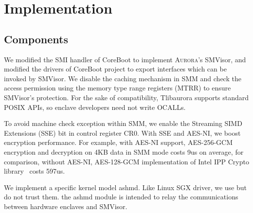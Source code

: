 \section{Implementation}

\subsection{Components}

We modified the SMI handler of CoreBoot to implement \textsc{Aurora}'s SMVisor, and modified the drivers of CoreBoot project to export interfaces which can be invoked by SMVisor. We disable the caching mechanism in SMM and check the access permission using the memory type range registers (MTRR) to ensure SMVisor's protection. For the sake of compatibility, Tlibaurora supports standard
POSIX APIs, so enclave developers need not write OCALLs.

To avoid machine check exception within SMM, we enable the Streaming SIMD Extensions (SSE) bit in control register CR0. With SSE and AES-NI, we boost encryption performance. For example, with AES-NI support, AES-256-GCM encryption and decryption on 4KB data in SMM mode costs 9us on average, for comparison,  without AES-NI, AES-128-GCM implementation of Intel IPP Crypto library~\cite{Intel_IPP_2017_Update_2} costs 597us.

We implement a specific kernel model ashmd. Like Linux SGX driver, we use but do not trust them. the ashmd module is intended to relay the communications between hardware enclaves and SMVisor.




